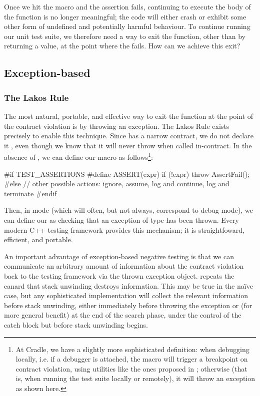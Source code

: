 Once we hit the  macro and the assertion fails, continuing to execute the body of the function is no longer meaningful; the code will either crash or exhibit some other form of undefined and potentially harmful behaviour. To continue running our unit test suite, we therefore need a way to exit the function, other than by returning a value, at the point where the  fails. How can we achieve this exit?

\subsection{Exception-based}

\subsubsection{The Lakos Rule}

The most natural, portable, and effective way to exit the function at the point of the contract violation is by throwing an exception. The Lakos Rule exists precisely to enable this technique. Since  has a narrow contract, we do not declare it , even though we know that it will never throw when called in-contract. In the absence of , we can define our  macro as follows\footnote{At Cradle, we have a slightly more sophisticated definition: when debugging locally, i.e. if a debugger is attached, the  macro will trigger a breakpoint on contract violation, using utilities like the ones proposed in \cite{P2514R0}; otherwise (that is, when running the test suite locally or remotely), it will throw an  exception as shown here.}:
\begin{codeblock}
#if TEST_ASSERTIONS
  #define ASSERT(expr) if (!expr) throw AssertFail();
#else
  // other possible actions: ignore, assume, log and continue, log and terminate
#endif
\end{codeblock}
Then, in  mode (which will often, but not always, correspond to debug mode), we can define our  as checking that an exception of type  has been thrown. Every modern C++ testing framework provides this mechanism; it is straightfoward, efficient, and portable.

An important advantage of exception-based negative testing is that we can communicate an arbitrary amount of information about the contract violation back to the testing framework via the thrown exception object. \cite{P1656R2} repeats the canard that stack unwinding destroys information. This may be true in the na\" ive case, but any sophisticated implementation will collect the relevant information before stack unwinding, either immediately before throwing the exception or (for more general benefit) at the end of the search phase, under the control of the catch block but before stack unwinding begins.

